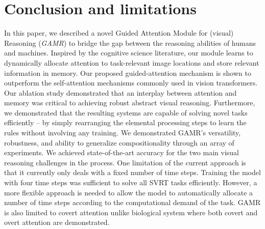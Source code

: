 \section{Conclusion and limitations}
\label{sec:conc}
In this paper, we described a novel Guided Attention Module for (visual) Reasoning (\textit{GAMR}) to bridge the gap between the reasoning abilities of humans and machines. 
Inspired by the cognitive science literature, our module learns to dynamically allocate attention to task-relevant image locations and store relevant information in memory. Our proposed guided-attention mechanism is shown to outperform the self-attention mechanisms commonly used in vision transformers. Our ablation study demonstrated that an interplay between attention and memory was critical to achieving robust abstract visual reasoning. 
Furthermore, we demonstrated that the resulting systems are capable of solving novel tasks efficiently -- by simply rearranging the elemental processing steps to learn the rules without involving any training. 
We demonstrated GAMR's versatility, robustness, and ability to generalize compositionality through an array of experiments. We achieved state-of-the-art accuracy for the two main visual reasoning challenges in the process.  One limitation of the current approach is that it currently only deals with a fixed number of time steps. Training the model with four time steps was sufficient to solve all SVRT tasks efficiently. However, a more flexible approach is needed to allow the model to  automatically allocate a number of time steps according to the computational demand of the task. GAMR is also limited to covert attention unlike biological system where both covert and overt attention are demonstrated. 

